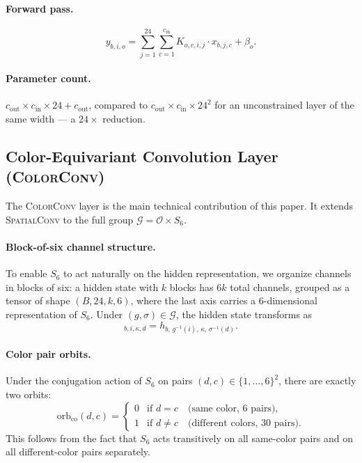 \documentclass[11pt]{article}
\newcommand{\bh}{\mathbf{h}}
\newcommand{\orbco}{\mathrm{orb}_{\mathrm{co}}}
\begin{document}
\paragraph{Forward pass.}
\begin{equation}
  y_{b,i,o} = \sum_{j=1}^{24} \sum_{c=1}^{c_{\mathrm{in}}}
              K_{o,c,i,j} \cdot x_{b,j,c} + \beta_o.
  \label{eq:groupconv_forward}
\end{equation}

\paragraph{Parameter count.}
$c_{\mathrm{out}} \times c_{\mathrm{in}} \times 24 + c_{\mathrm{out}}$,
compared to $c_{\mathrm{out}} \times c_{\mathrm{in}} \times 24^2$ for an
unconstrained layer of the same width — a $24\times$ reduction.

\subsection{Color-Equivariant Convolution Layer (\textsc{ColorConv})}
\label{sec:colorconv}

The \textsc{ColorConv} layer is the main technical contribution of this
paper.
It extends \textsc{SpatialConv} to the full group
$\mathcal{G} = \mathcal{O} \times S_6$.

\paragraph{Block-of-six channel structure.}
To enable $S_6$ to act naturally on the hidden representation, we organize
channels in blocks of six: a hidden state with $k$ blocks has
$6k$ total channels, grouped as a tensor of shape
$(B, 24, k, 6)$, where the last axis carries a 6-dimensional representation
of $S_6$.
Under $(g, \sigma) \in \mathcal{G}$, the hidden state transforms as
\begin{equation}
  [(g, \sigma) \cdot \bh]_{b,i,\kappa,d} = h_{b,\, g^{-1}(i),\, \kappa,\, \sigma^{-1}(d)}.
  \label{eq:hidden_action}
\end{equation}

\paragraph{Color pair orbits.}
Under the conjugation action of $S_6$ on pairs $(d, c) \in \{1,\ldots,6\}^2$,
there are exactly two orbits:
\begin{equation}
  \orbco(d, c) =
  \begin{cases}
    0 & \text{if } d = c \quad \text{(same color, 6 pairs)}, \\
    1 & \text{if } d \neq c \quad \text{(different colors, 30 pairs)}.
  \end{cases}
  \label{eq:color_orbits}
\end{equation}
This follows from the fact that $S_6$ acts transitively on all same-color
pairs and on all different-color pairs separately.
\end{document}
